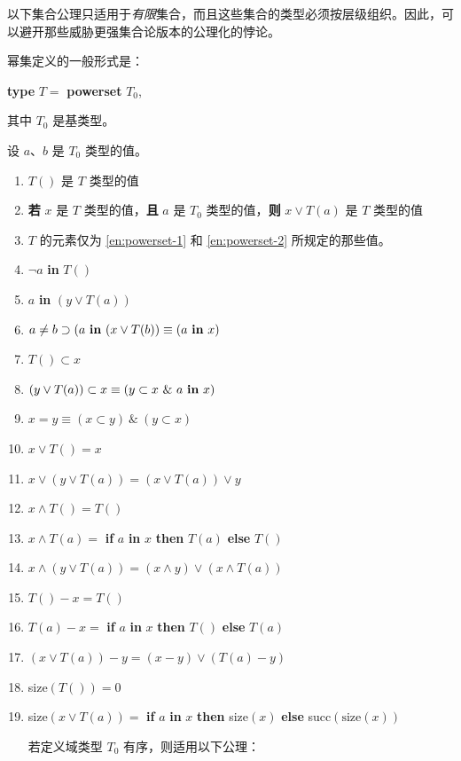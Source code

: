 \documentclass[twoside,11pt,fontset=none]{ctexbook}
\begin{document}
以下集合公理只适用于\textit{有限}集合，而且这些集合的类型必须按层级组织。因此，可以避开那些威胁更强集合论版本的公理化的悖论。

幂集定义的一般形式是：

\quad \textbf{type} $T =$ \textbf{powerset} $T_0$,

\noindent
其中 $T_0$ 是基类型。

\noindent
设 $a$、$b$ 是 $T_0$ 类型的值。

\begin{enumerate}[wide, nosep, label=(\arabic*)]
	\item \label{en:powerset-1}
	$T()$ 是 $T$ 类型的值
	\item \label{en:powerset-2}
	\textbf{若} $x$ 是 $T$ 类型的值，\textbf{且} $a$ 是 $T_0$ 类型的值，\textbf{则} $x \vee T(a)$ 是 $T$ 类型的值
	\item $T$ 的元素仅为 \ref{en:powerset-1} 和 \ref{en:powerset-2} 所规定的那些值。
	\item $\neg a$ \textbf{in} $T()$
	\item $a$ \textbf{in} $(y \lor T(a))$
	\item $a \neq b \supset (a \text{ \textbf{in} } (x \lor T(b)) \equiv (a \text{ \textbf{in} } x)$
	\item $T() \subset x$
	\item $(y \lor T(a)) \subset x \equiv (y \subset x\ \&\ a \text{ \textbf{in} } x)$
	\item $x = y \equiv (x \subset y)\ \&\ (y \subset x)$
	\setcounter{enumi}{9}
	\item $x \lor T() = x$
	\item $x \lor (y \lor T(a)) = (x \lor T(a)) \lor y$
	\item $x \land T() = T()$
	\item $x \land T(a) =$ \textbf{if} $a$ \textbf{in} $x$ \textbf{then} $T(a)$ \textbf{else} $T()$
	\item $x \land (y \lor T(a)) = (x \land y) \lor (x \land T(a))$
	\item $T() - x = T()$
	\item $T(a) - x =$ \textbf{if} $a$ \textbf{in} $x$ \textbf{then} $T()$ \textbf{else} $T(a)$
	\item $(x \lor T(a)) - y = (x - y) \lor (T(a) - y)$
	\item size$(T()) = 0$
	\item size$(x \lor T(a)) =$ \textbf{if} $a$ \textbf{in} $x$ \textbf{then} size$(x)$ \textbf{else} succ$(\text{size}(x))$

	若定义域类型 $T_0$ 有序，则适用以下公理：


\end{enumerate}
\end{document}
